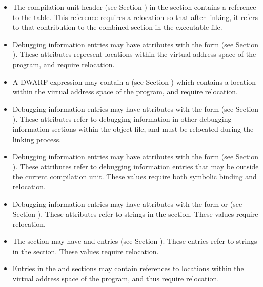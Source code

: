 \begin{itemize}
\item The compilation unit header (see Section 
) in the \dotdebuginfo{}
section contains a reference to the \dotdebugabbrev{} table. This
reference requires a relocation so that after linking, it refers to
that contribution to the combined \dotdebugabbrev{} section in the
executable file.

\item Debugging information entries may have attributes with the form
\DWFORMaddr{} (see Section ). 
These attributes represent locations
within the virtual address space of the program, and require
relocation.

\item A DWARF expression may contain a \DWOPaddr{} (see Section 
) which contains a location within 
the virtual address space of the program, and require relocation.

\item Debugging information entries may have attributes with the form
\DWFORMsecoffset{} (see Section ). 
These attributes refer to
debugging information in other debugging information sections within
the object file, and must be relocated during the linking process.

\item Debugging information entries may have attributes with the form
\DWFORMrefaddr{} (see Section ). 
These attributes refer to
debugging information entries that may be outside the current
compilation unit. These values require both symbolic binding and
relocation.

\item Debugging information entries may have attributes with the form
\DWFORMstrp{} 
\bb
or \DWFORMstrpeight{}
\eb
(see Section ). 
These attributes refer to strings in
the \dotdebugstr{} section. These values require relocation.

\bb
\item The \dotdebugmacro{} section may have \DWMACROdefinestrp{} and
\DWMACROundefstrp{} entries (see Section ).
These entries refer to strings in the \dotdebugstr{} section.
These values require relocation.
\eb

\item Entries in the \dotdebugaddr{} and \dotdebugaranges{}
sections may contain references to locations within the virtual address
space of the program, and thus require relocation.


\end{itemize}
